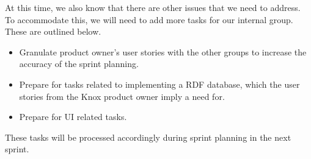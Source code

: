 At this time, we also know that there are other issues that we need to address. To accommodate this, we will need to add more tasks for our internal group. These are outlined below.

\begin{itemize}
    \item Granulate product owner's user stories with the other \knox{} groups to increase the accuracy of the sprint planning.
    \item Prepare for tasks related to implementing a RDF database, which the user stories from the Knox product owner imply a need for.
    \item Prepare for UI related tasks.
\end{itemize}

These tasks will be processed accordingly during sprint planning in the next sprint.